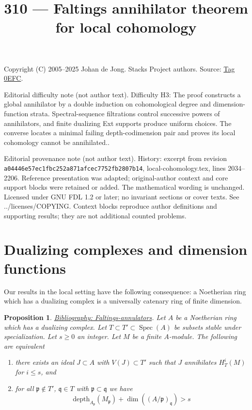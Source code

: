 \documentclass{amsart}
\newenvironment{reference}{\comment}{\endcomment}
\theoremstyle{plain}
\newtheorem{proposition}[subsection]{Proposition}
\theoremstyle{definition}
\theoremstyle{remark}
\numberwithin{equation}{subsection}
\def\Spec{\mathop{\mathrm{Spec}}}
\begin{document}
\title[Stacks Project, Tag 0EFC]{310 --- Faltings annihilator theorem for local cohomology}
\maketitle
\noindent Copyright (C) 2005--2025 Johan de Jong. Stacks Project authors. Source: \href{https://stacks.math.columbia.edu/tag/0EFC}{Tag 0EFC}.

\noindent Editorial difficulty note (not author text). Difficulty H3: The proof constructs a global annihilator by a double induction on cohomological degree and dimension-function strata. Spectral-sequence filtrations control successive powers of annihilators, and finite dualizing Ext supports produce uniform choices. The converse locates a minimal failing depth-codimension pair and proves its local cohomology cannot be annihilated..

\noindent Editorial provenance note (not author text). History: excerpt from revision \texttt{a0444\allowbreak 6e57e\allowbreak c1fbc\allowbreak 252a8\allowbreak 71afc\allowbreak ec775\allowbreak 2fb28\allowbreak 07b14}, local-cohomology.tex, lines 2034--2206. Reference presentation was adapted; original-author context and core support blocks were retained or added. The mathematical wording is unchanged. Licensed under GNU FDL 1.2 or later; no invariant sections or cover texts. See ../licenses/COPYING. Context blocks reproduce author definitions and supporting results; they are not additional counted problems.

\section{Dualizing complexes and dimension functions}
\label{dualizing-section-dimension-function}

\noindent
Our results in the local setting have the following consequence:
a Noetherian ring which has a dualizing complex is a
universally catenary ring of finite dimension.



\begin{proposition}
\label{proposition-annihilator}
\begin{reference}
\href{https://stacks.math.columbia.edu/bibliography}{Bibliography: Faltings-annulators}.
\end{reference}
Let $A$ be a Noetherian ring which has a dualizing complex.
Let $T \subset T' \subset \Spec(A)$ be subsets stable under
specialization. Let $s \geq 0$ an integer. Let $M$ be a finite $A$-module.
The following are equivalent
\begin{enumerate}
\item there exists an ideal $J \subset A$ with $V(J) \subset T'$
such that $J$ annihilates $H^i_T(M)$ for $i \leq s$, and
\item for all $\mathfrak p \not \in T'$,
$\mathfrak q \in T$ with $\mathfrak p \subset \mathfrak q$
we have
$$
\text{depth}_{A_\mathfrak p}(M_\mathfrak p) +
\dim((A/\mathfrak p)_\mathfrak q) > s
$$
\end{enumerate}
\end{proposition}
\end{document}
